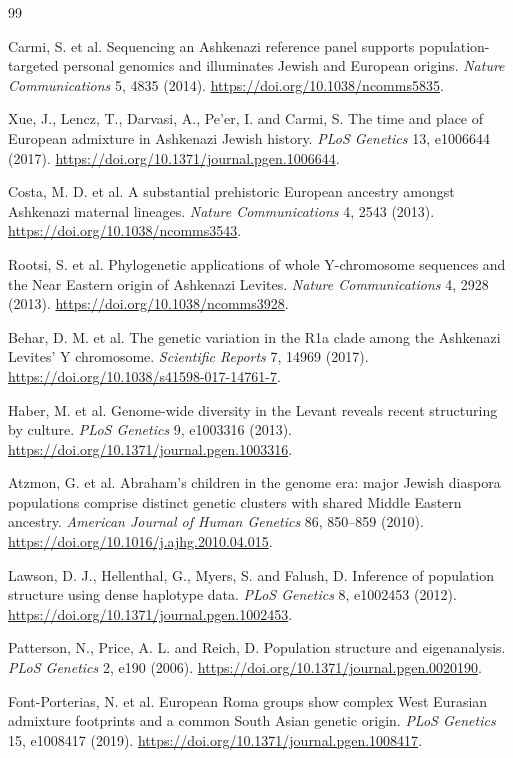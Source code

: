 \documentclass[11pt]{article}
\begin{document}
\begin{thebibliography}{99}

Carmi, S. et al. Sequencing an Ashkenazi reference panel supports population-targeted personal genomics and illuminates Jewish and European origins. \emph{Nature Communications} 5, 4835 (2014). \url{https://doi.org/10.1038/ncomms5835}.

Xue, J., Lencz, T., Darvasi, A., Pe'er, I. and Carmi, S. The time and place of European admixture in Ashkenazi Jewish history. \emph{PLoS Genetics} 13, e1006644 (2017). \url{https://doi.org/10.1371/journal.pgen.1006644}.

Costa, M. D. et al. A substantial prehistoric European ancestry amongst Ashkenazi maternal lineages. \emph{Nature Communications} 4, 2543 (2013). \url{https://doi.org/10.1038/ncomms3543}.

Rootsi, S. et al. Phylogenetic applications of whole Y-chromosome sequences and the Near Eastern origin of Ashkenazi Levites. \emph{Nature Communications} 4, 2928 (2013). \url{https://doi.org/10.1038/ncomms3928}.

Behar, D. M. et al. The genetic variation in the R1a clade among the Ashkenazi Levites' Y chromosome. \emph{Scientific Reports} 7, 14969 (2017). \url{https://doi.org/10.1038/s41598-017-14761-7}.

Haber, M. et al. Genome-wide diversity in the Levant reveals recent structuring by culture. \emph{PLoS Genetics} 9, e1003316 (2013). \url{https://doi.org/10.1371/journal.pgen.1003316}.

Atzmon, G. et al. Abraham's children in the genome era: major Jewish diaspora populations comprise distinct genetic clusters with shared Middle Eastern ancestry. \emph{American Journal of Human Genetics} 86, 850--859 (2010). \url{https://doi.org/10.1016/j.ajhg.2010.04.015}.

Lawson, D. J., Hellenthal, G., Myers, S. and Falush, D. Inference of population structure using dense haplotype data. \emph{PLoS Genetics} 8, e1002453 (2012). \url{https://doi.org/10.1371/journal.pgen.1002453}.

Patterson, N., Price, A. L. and Reich, D. Population structure and eigenanalysis. \emph{PLoS Genetics} 2, e190 (2006). \url{https://doi.org/10.1371/journal.pgen.0020190}.

Font-Porterias, N. et al. European Roma groups show complex West Eurasian admixture footprints and a common South Asian genetic origin. \emph{PLoS Genetics} 15, e1008417 (2019). \url{https://doi.org/10.1371/journal.pgen.1008417}.


\end{thebibliography}
\end{document}
